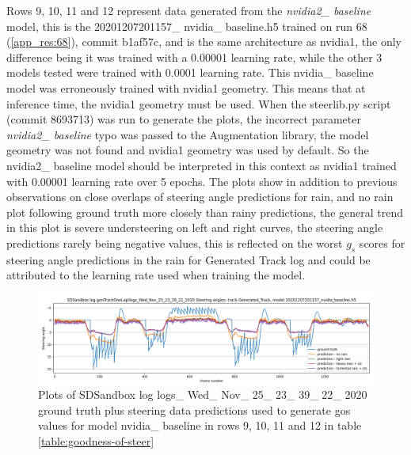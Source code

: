 Rows 9, 10, 11 and 12 represent data generated from the \textit{nvidia2\_ baseline} model, this is the 20201207201157\_ nvidia\_ baseline.h5 trained on run 68 (\ref{app_res:68}), commit b1af57c, and is the same architecture as nvidia1, the only difference being it was trained with a 0.00001 learning rate, while the other 3 models tested were trained with 0.0001 learning rate. This nvidia\_ baseline model was erroneously trained with nvidia1 geometry. This means that at inference time, the nvidia1 geometry must be used. When the steerlib.py script (commit 8693713) was run to generate the plots, the incorrect parameter \textit{nvidia2\_ baseline} typo was passed to the Augmentation library, the model geometry was not found and nvidia1 geometry was used by default. So the nvidia2\_ baseline model should be interpreted in this context as nvidia1 trained with 0.00001 learning rate over 5 epochs. The plots show in addition to previous observations on close overlaps of steering angle predictions for rain, and no rain plot following ground truth more closely than rainy predictions, the general trend in this plot is severe understeering on left and right curves, the steering angle predictions rarely being negative values, this is reflected on the worst $g_s$ scores for steering angle predictions in the rain for Generated Track log and could be attributed to the learning rate used when training the model.

\begin{figure}[h!]
 \centering 
 \includegraphics[width=\textwidth]{Figures/sa_Generated_Track_20201207201157_nvidia_baseline.h5.png}
 \caption{Plots of SDSandbox log logs\_ Wed\_ Nov\_ 25\_ 23\_ 39\_ 22\_ 2020 ground truth plus steering data predictions used to generate gos values for model nvidia\_ baseline in rows 9, 10, 11  and 12 in table \ref{table:goodness-of-steer}}
 \label{fig:sa_Generated_Track_20201207201157_nvidia_baseline.h5} 
\end{figure}


